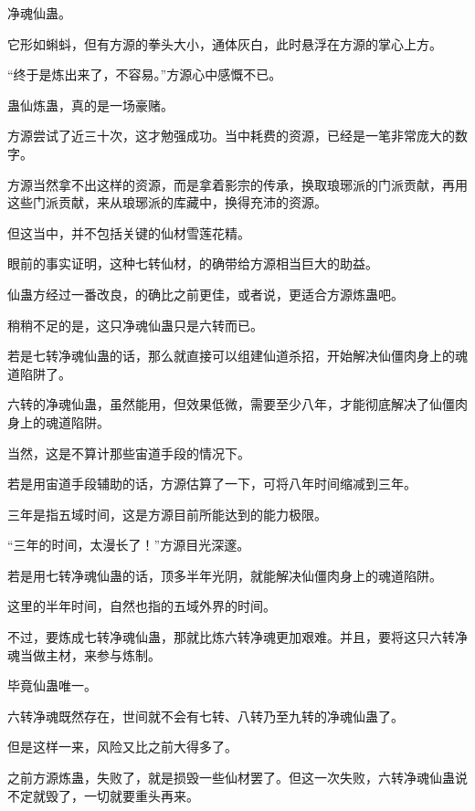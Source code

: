 
\begin{this_body}



净魂仙蛊。

它形如蝌蚪，但有方源的拳头大小，通体灰白，此时悬浮在方源的掌心上方。

“终于是炼出来了，不容易。”方源心中感慨不已。

蛊仙炼蛊，真的是一场豪赌。

方源尝试了近三十次，这才勉强成功。当中耗费的资源，已经是一笔非常庞大的数字。

方源当然拿不出这样的资源，而是拿着影宗的传承，换取琅琊派的门派贡献，再用这些门派贡献，来从琅琊派的库藏中，换得充沛的资源。

但这当中，并不包括关键的仙材雪莲花精。

眼前的事实证明，这种七转仙材，的确带给方源相当巨大的助益。

仙蛊方经过一番改良，的确比之前更佳，或者说，更适合方源炼蛊吧。

稍稍不足的是，这只净魂仙蛊只是六转而已。

若是七转净魂仙蛊的话，那么就直接可以组建仙道杀招，开始解决仙僵肉身上的魂道陷阱了。

六转的净魂仙蛊，虽然能用，但效果低微，需要至少八年，才能彻底解决了仙僵肉身上的魂道陷阱。

当然，这是不算计那些宙道手段的情况下。

若是用宙道手段辅助的话，方源估算了一下，可将八年时间缩减到三年。

三年是指五域时间，这是方源目前所能达到的能力极限。

“三年的时间，太漫长了！”方源目光深邃。

若是用七转净魂仙蛊的话，顶多半年光阴，就能解决仙僵肉身上的魂道陷阱。

这里的半年时间，自然也指的五域外界的时间。

不过，要炼成七转净魂仙蛊，那就比炼六转净魂更加艰难。并且，要将这只六转净魂当做主材，来参与炼制。

毕竟仙蛊唯一。

六转净魂既然存在，世间就不会有七转、八转乃至九转的净魂仙蛊了。

但是这样一来，风险又比之前大得多了。

之前方源炼蛊，失败了，就是损毁一些仙材罢了。但这一次失败，六转净魂仙蛊说不定就毁了，一切就要重头再来。


\end{this_body}
